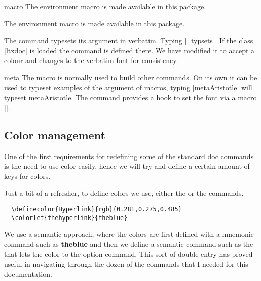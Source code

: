 \begin{environment}{macro} The environment macro is made available in this
package. 
\end{environment}

 The environment macro is made available in this package. 

\begin{macro}{\cmd} The command \cmd{\cmd} typesets its argument in
  verbatim. Typing |\cmd{\cmd}| typsets \cmd{\cmd}. If the class
  |ltxdoc| is loaded the command is defined there. We have modified
  it to accept a colour and changes to the verbatim font 
  for consistency.
\end{macro}

\begin{macro}{meta}
The macro  is normally used to build other commands. On its own it can be used to typeset
examples of the argument of macros, typing |meta{Aristotle}| will typeset meta{Aristotle}. The command provides a hook to set the font via a macro |\meta@font@select|. 
\end{macro}


\def\meta@font@select{\upshape\color{black}}


\subsection{Color management}
One of the first requirements for redefining some of the standard doc commands is the need to use color easily, hence we will try and define a certain amount of keys for colors.

Just a bit of a refresher, to define colors we use, either the  or the  commands.

\begin{tcolorbox}
\begin{lstlisting}
  \definecolor{Hyperlink}{rgb}{0.281,0.275,0.485}
  \colorlet{thehyperlink}{theblue}
\end{lstlisting}
\end{tcolorbox}

We use a semantic approach, where the colors are first defined with a mnemonic command such as {\bfseries\textcolor{theblue}{theblue}} and then we define a semantic command such as the that lets the color to the option command. This sort of double entry has proved useful in navigating through the dozen of the commands that I needed for this documentation.


